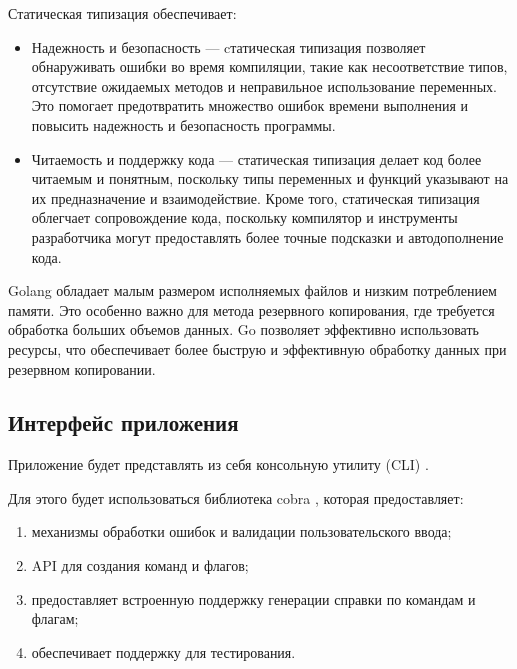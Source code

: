 \begin{flushleft}
Статическая типизация обеспечивает:
\end{flushleft}
\begin{itemize}[label=\textbullet]
\item Надежность и безопасность --- cтатическая типизация позволяет обнаруживать ошибки во время компиляции, такие как несоответствие типов, отсутствие ожидаемых методов и неправильное использование переменных. Это помогает предотвратить множество ошибок времени выполнения и повысить надежность и безопасность программы.

\item Читаемость и поддержку кода --- статическая типизация делает код более читаемым и понятным, поскольку типы переменных и функций указывают на их предназначение и взаимодействие. Кроме того, статическая типизация облегчает сопровождение кода, поскольку компилятор и инструменты разработчика могут предоставлять более точные подсказки и автодополнение кода.
\end{itemize}

%

Golang обладает малым размером исполняемых файлов и низким потреблением памяти. Это особенно важно для метода резервного копирования, где требуется обработка больших объемов данных. Go позволяет эффективно использовать ресурсы, что обеспечивает более быструю и эффективную обработку данных при резервном копировании.

\subsection{Интерфейс приложения}

Приложение будет представлять из себя консольную утилиту (CLI) \cite{cli}.

Для этого будет использоваться библиотека cobra \cite{cobra}, которая предоставляет:
\begin{enumerate}
\item механизмы обработки ошибок и валидации пользовательского ввода;
\item API для создания команд и флагов;
\item предоставляет встроенную поддержку генерации справки по командам и флагам;
\item обеспечивает поддержку для тестирования.
\end{enumerate}

